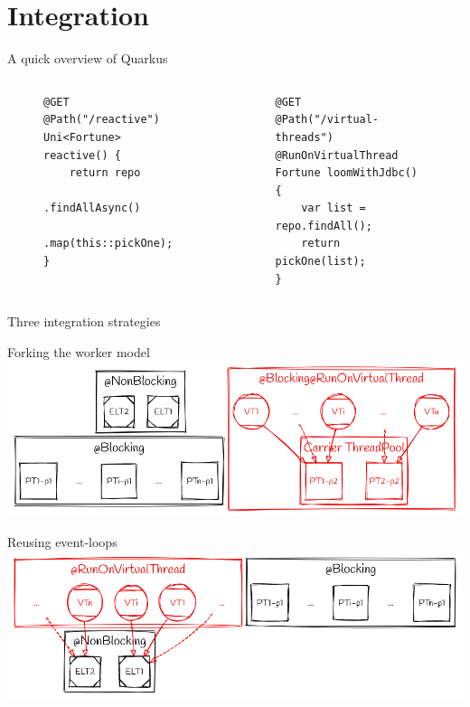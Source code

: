 \documentclass{beamer}
\begin{document}
\section{Integration}
\begin{frame}[fragile]{A quick overview of Quarkus}
    \begin{columns}
        \begin{column}{0.55\textwidth}
            \begin{figure}
                \begin{lstlisting}
@GET
@Path("/reactive")
Uni<Fortune> reactive() {
    return repo
        .findAllAsync()
        .map(this::pickOne);
}
                \end{lstlisting}
            \end{figure}
        \end{column}
        \begin{column}{0.55\textwidth}
            \begin{figure}
                \begin{lstlisting}
@GET
@Path("/virtual-threads")
@RunOnVirtualThread
Fortune loomWithJdbc() {
    var list = repo.findAll();
    return pickOne(list);
}
                \end{lstlisting}
            \end{figure}
        \end{column}
    \end{columns}
\end{frame}
\begin{frame}{Three integration strategies}
    
\end{frame}
\begin{frame}{Forking the worker model}
    \includegraphics[width=\textwidth]{assets/forking_workers.png}
\end{frame}
\begin{frame}{Reusing event-loops}
    \includegraphics[width=\textwidth]{assets/el_ct.png}
\end{frame}
\end{document}
